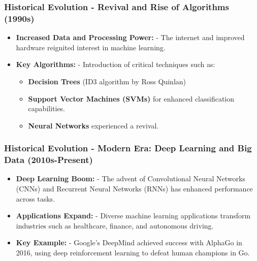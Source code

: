 \documentclass[aspectratio=169]{beamer}
\begin{document}
\begin{frame}[fragile]
    \frametitle{Historical Evolution - Revival and Rise of Algorithms (1990s)}
    \begin{itemize}
        \item \textbf{Increased Data and Processing Power:} 
            - The internet and improved hardware reignited interest in machine learning.
        \item \textbf{Key Algorithms:} 
            - Introduction of critical techniques such as:
                \begin{itemize}
                    \item \textbf{Decision Trees} (ID3 algorithm by Ross Quinlan)
                    \item \textbf{Support Vector Machines (SVMs)} for enhanced classification capabilities.
                    \item \textbf{Neural Networks} experienced a revival.
                \end{itemize}
    \end{itemize}
\end{frame}

\begin{frame}[fragile]
    \frametitle{Historical Evolution - Modern Era: Deep Learning and Big Data (2010s-Present)}
    \begin{itemize}
        \item \textbf{Deep Learning Boom:} 
            - The advent of Convolutional Neural Networks (CNNs) and Recurrent Neural Networks (RNNs) has enhanced performance across tasks.
        \item \textbf{Applications Expand:} 
            - Diverse machine learning applications transform industries such as healthcare, finance, and autonomous driving.
        \item \textbf{Key Example:} 
            - Google's DeepMind achieved success with AlphaGo in 2016, using deep reinforcement learning to defeat human champions in Go.
    \end{itemize}
\end{frame}
\end{document}
